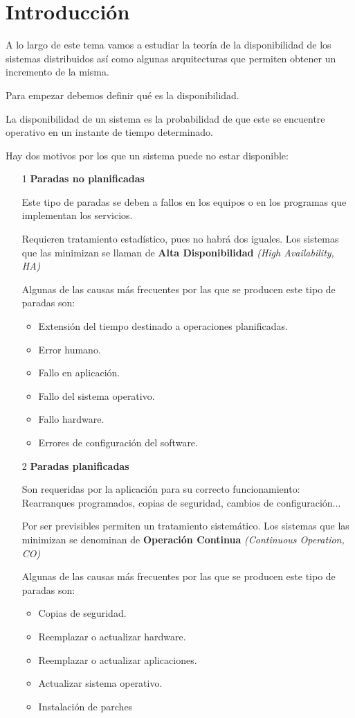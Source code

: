 \section{Introducción}
A lo largo de este tema vamos a estudiar la teoría de la disponibilidad de los sistemas distribuidos así como algunas arquitecturas que permiten obtener un incremento de la misma.

Para empezar debemos definir qué es la disponibilidad.

\begin{defn}[Disponibilidad]
La disponibilidad de un sistema es la probabilidad de que este se encuentre operativo en un instante de tiempo determinado.
\end{defn}

Hay dos motivos por los que un sistema puede no estar disponible:
\begin{enumerate}
\item[1] \textbf{Paradas no planificadas}

Este tipo de paradas se deben a fallos en los equipos o en los programas que implementan los servicios.

Requieren tratamiento estadístico, pues no habrá dos iguales. Los sistemas que las minimizan se llaman de \textbf{Alta Disponibilidad} \textit{(High Availability, HA)}


Algunas de las causas más frecuentes por las que se producen este tipo de paradas son:

\begin{itemize}
\item Extensión del tiempo destinado a operaciones planificadas.
\item Error humano.
\item Fallo en aplicación.
\item Fallo del sistema operativo.
\item Fallo hardware.
\item Errores de configuración del software.
\end{itemize}

\item[2] \textbf{Paradas planificadas}

Son requeridas por la aplicación para su correcto funcionamiento: Rearranques programados, copias de seguridad, cambios de configuración...

Por ser previsibles permiten un tratamiento sistemático. Los sistemas que las minimizan se denominan de \textbf{Operación Continua} \textit{(Continuous Operation, CO)}

Algunas de las causas más frecuentes por las que se producen este tipo de paradas son:

\begin{itemize}
\item Copias de seguridad.
\item Reemplazar o actualizar hardware.
\item Reemplazar o actualizar aplicaciones.
\item Actualizar sistema operativo.
\item Instalación de parches
\end{itemize}
\end{enumerate}

